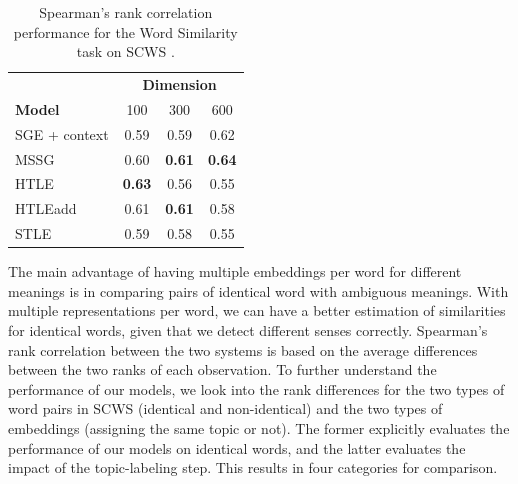 \begin{table}[tbh!]
\centering
\small
\caption{Spearman's rank correlation performance for the Word Similarity task on SCWS \citep{huang2012improving}.\label{scws}}
\begin{tabular}{lccc}%
\toprule
                            & \multicolumn{3}{c}{\textbf{Dimension}} \\ \cmidrule(r){2-4}
      \textbf{Model}        & 100         & 300         & 600         \\ \midrule
SGE + context  \citep{mikolov2013efficient}  &     0.59        &    0.59         &      0.62       \\
MSSG \citep{neelakantan2014efficient} & 0.60 & \bf 0.61  & \textbf{0.64} \\\cmidrule(r){1-4}
HTLE          &     \textbf{0.63}        &       0.56      &       0.55      \\
HTLEadd              &         0.61    &      \textbf{0.61}       &      0.58       \\
STLE                      &     0.59        &      0.58       &       0.55      \\ \bottomrule
\end{tabular}
\end{table}

The main advantage of having multiple embeddings per word for different meanings is in comparing pairs of identical word with ambiguous meanings. 
With multiple representations per word, we can have a better estimation of similarities for identical words, given that we detect different senses correctly. 
Spearman's rank correlation between the two systems is based on the average differences between the two ranks of each observation. 
To further understand the performance of our models, we look into the rank differences for the two types of word pairs in SCWS (identical and non-identical) and the two types of embeddings (assigning the same topic or not).
The former explicitly evaluates the performance of our models on identical words, and the latter evaluates the impact of the topic-labeling step.
This results in four categories for comparison.

